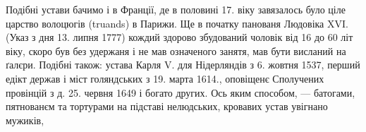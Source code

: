 Подібні устави бачимо і в Франції, де в половині 17.
віку завязалось було ціле царство волоцюгів (truands) в Парижи.
Ще в початку панованя Людовіка XVI. (Указ з дня
13. липня 1777) кождий здорово збудований чоловік від 16
до 60 літ віку, скоро був без удержаня і не мав означеного
занятя, мав бути висланий на ґалєри. Подібні також: устава
Карля V. для Нідерляндів з 6. жовтня 1537, перший едікт
держав і міст голяндських з 19. марта 1614., оповіщенє Сполучених
провінцій з д. 25. червня 1649 і богато других.
Ось яким способом, — батогами, пятнованєм та тортурами
на підставі нелюдських, кровавих устав увігнано мужиків, \parbreak{}
